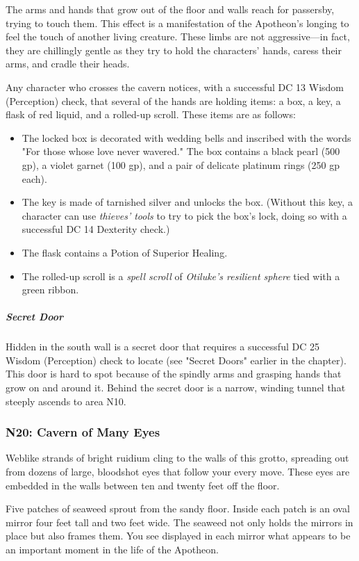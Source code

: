 \documentclass[10pt,a4paper,twoside,fancy,bg=print,twocolumn,openany,nodeprecatedcode]{dndbook}
\begin{document}
The arms and hands that grow out of the floor and walls reach for passersby, trying to touch them. This effect is a manifestation of the Apotheon's longing to feel the touch of another living creature. These limbs are not aggressive—in fact, they are chillingly gentle as they try to hold the characters' hands, caress their arms, and cradle their heads.

Any character who crosses the cavern notices, with a successful DC 13 Wisdom (Perception) check, that several of the hands are holding items: a box, a key, a flask of red liquid, and a rolled-up scroll. These items are as follows:


\begin{itemize}
\item The locked box is decorated with wedding bells and inscribed with the words "For those whose love never wavered." The box contains a black pearl (500 gp), a violet garnet (100 gp), and a pair of delicate platinum rings (250 gp each).
\item The key is made of tarnished silver and unlocks the box. (Without this key, a character can use \textit{thieves' tools} to try to pick the box's lock, doing so with a successful DC 14 Dexterity check.)
\item The flask contains a Potion of Superior Healing.
\item The rolled-up scroll is a \textit{spell scroll} of \textit{Otiluke's resilient sphere} tied with a green ribbon.
\end{itemize}

\subparagraph{Secret Door}
Hidden in the south wall is a secret door that requires a successful DC 25 Wisdom (Perception) check to locate (see "Secret Doors" earlier in the chapter). This door is hard to spot because of the spindly arms and grasping hands that grow on and around it. Behind the secret door is a narrow, winding tunnel that steeply ascends to area N10.

\subsubsection{N20: Cavern of Many Eyes}
\begin{DndReadAloud}{}
Weblike strands of bright ruidium cling to the walls of this grotto, spreading out from dozens of large, bloodshot eyes that follow your every move. These eyes are embedded in the walls between ten and twenty feet off the floor.

Five patches of seaweed sprout from the sandy floor. Inside each patch is an oval mirror four feet tall and two feet wide. The seaweed not only holds the mirrors in place but also frames them. You see displayed in each mirror what appears to be an important moment in the life of the Apotheon.

\end{DndReadAloud}
\end{document}
